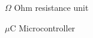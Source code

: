 \begin{listofsymbols}
  \item[$ \Omega $] Ohm resistance unit
  \item[$\mu$C] Microcontroller
\end{listofsymbols}
